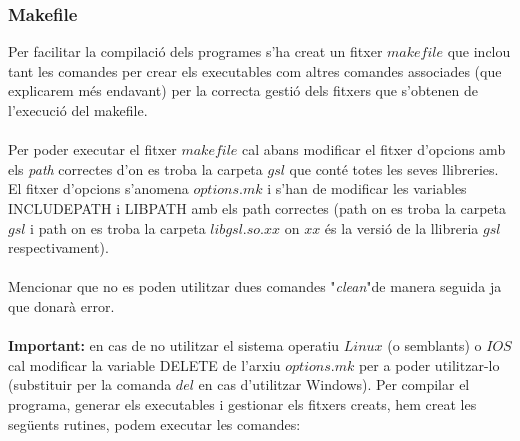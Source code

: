 \documentclass[a4paper, 11pt]{article}
\begin{document}
\subsubsection{Makefile}
Per facilitar la compilació dels programes s'ha creat un fitxer $makefile$ que inclou tant les comandes per crear els executables com altres comandes associades (que explicarem més endavant) per la correcta gestió dels fitxers que s'obtenen de l'execució del makefile.\\\\
Per poder executar el fitxer $makefile$ cal abans modificar el fitxer d'opcions amb els \textit{path} correctes d'on es troba la carpeta $gsl$ que conté totes les seves llibreries.\\
El fitxer d'opcions s'anomena $options.mk$ i s'han de modificar les variables \textcolor{amaranth}{INCLUDEPATH} i \textcolor{amaranth}{LIBPATH} amb els path correctes (path on es troba la carpeta $gsl$ i path on es troba la carpeta $libgsl.so.xx$ on $xx$ és la versió de la llibreria $gsl$ respectivament).\\\\
Mencionar que no es poden utilitzar dues comandes "\textit{clean}"\hspace{0.4em}de manera seguida ja que donarà error.\\\\
\textbf{Important:} en cas de no utilitzar el sistema operatiu $Linux$ (o semblants) o $IOS$ cal modificar la variable \textcolor{amaranth}{DELETE} de l'arxiu $options.mk$ per a poder utilitzar-lo (substituir per la comanda $del$ en cas d'utilitzar Windows).
\newpage
\hspace{-1.5em}Per compilar el programa, generar els executables i gestionar els fitxers creats, hem creat les següents rutines, podem executar les comandes:\\
\end{document}
